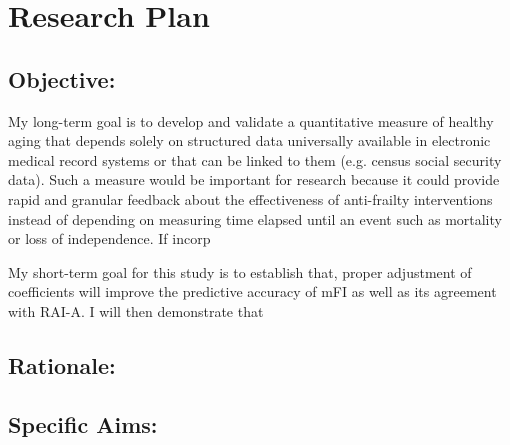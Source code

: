 \section{Research Plan }\label{research-plan}


\subsection{Objective:}\label{objective}
  
My long-term goal is to develop and validate a quantitative measure of healthy aging that depends solely on structured data universally available in electronic medical record systems or that can be linked to them (e.g. census social security data). Such a measure would be important for research because it could provide rapid and granular feedback about the effectiveness of anti-frailty interventions instead of depending on measuring time elapsed until an event such as mortality or loss of independence. If incorp 

My short-term goal for this study is to establish that, proper adjustment of coefficients will improve the predictive accuracy of mFI as well as its agreement with RAI-A. I will then demonstrate that 

\subsection{Rationale:}\label{rationale}

\subsection{Specific Aims:}\label{specific-aims}
